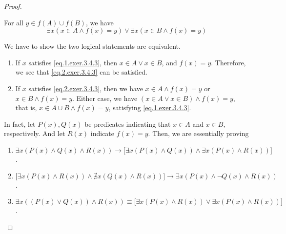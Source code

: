 \begin{proof}
\begin{enumerate}
		For all $y \in f(A) \cup f(B)$, we have
		\begin{equation}
			\exists x(x \in A \wedge f(x) = y) \vee \exists x(x \in B \wedge f(x) = y) \label{eq.2.exer.3.4.3}
		\end{equation}
		
		We have to show the two logical statements are equivalent.
		\begin{enumerate}
			\item If $x$ satisfies \eqref{eq.1.exer.3.4.3}, then $x \in A \vee x \in B$, and $f(x) = y$. Therefore, we see that \eqref{eq.2.exer.3.4.3} can be satisfied.
			
			\item If $x$ satisfies \eqref{eq.2.exer.3.4.3}, then we have $x \in A \wedge f(x) = y$ or $x \in B \wedge f(x) = y$. Either case, we have $(x \in A \vee x \in B) \wedge f(x) = y$, that is, $x \in A \cup B \wedge f(x) = y$, satisfying \eqref{eq.1.exer.3.4.3}.
		\end{enumerate}
	\end{enumerate}

	In fact, let $P(x), Q(x)$ be predicates indicating that $x \in A$ and $x \in B$, respectively. And let $R(x)$ indicate $f(x) = y$. Then, we are essentially proving
	\begin{enumerate}
		\item $\exists x(P(x) \wedge Q(x) \wedge R(x)) \to \bigl[\exists x(P(x) \wedge Q(x)) \wedge \exists x(P(x) \wedge R(x))\bigr]$.
		\item $\bigl[\exists x(P(x) \wedge R(x)) \wedge \nexists x(Q(x) \wedge R(x))\bigr] \to \exists x(P(x) \wedge \neg Q(x) \wedge R(x))$.
		\item $\exists x((P(x) \vee Q(x)) \wedge R(x)) \equiv \bigl[\exists x(P(x) \wedge R(x)) \vee \exists x (P(x) \wedge R(x))\bigr]$.
	\end{enumerate}
\end{proof}


